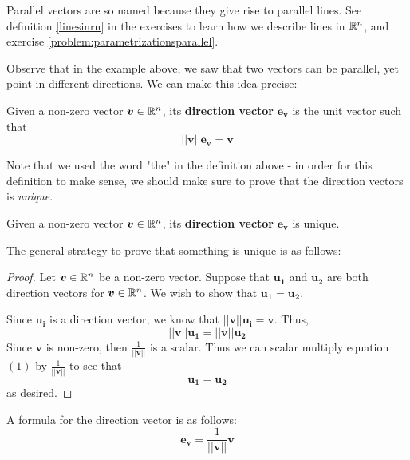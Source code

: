 Parallel vectors are so named because they give rise to parallel lines.  See definition \ref{linesinrn} in the exercises to learn how we describe lines in $\mathbb{R}^n$, and exercise \ref{problem:parametrizationsparallel}.

Observe that in the example above, we saw that two vectors can be parallel, yet point in different directions.  We can make this idea precise:

    \begin{definition}
    Given a non-zero vector $\bm{v} \in \mathbb{R}^n$, its \textbf{direction vector} $\bm{e_v}$ is the unit vector such that 
    $$||\bm{v}||\bm{e_v} = \bm{v}$$
    \end{definition}

Note that we used the word "the" in the definition above - in order for this definition to make sense, we should make sure to prove that the direction vectors is \textit{unique}.

\begin{proposition}
    Given a non-zero vector $\bm{v} \in \mathbb{R}^n$, its \textbf{direction vector} $\bm{e_v}$ is unique. 
\end{proposition}

The general strategy to prove that something is unique is as follows:





\begin{proof}
    Let $\bm{v} \in \mathbb{R}^n$ be a non-zero vector.  Suppose that $\bm{u_1}$ and $\bm{u_2}$ are both direction vectors for $\bm{v} \in \mathbb{R}^n$.  We wish to show that $\bm{u_1} = \bm{u_2}$. 

    Since $\bm{u_i}$ is a direction vector, we know that $||\bm{v}||\bm{u_i} = \bm{v}$.  Thus, \begin{equation}
        ||\bm{v}||\bm{u_1} = ||\bm{v}||\bm{u_2}
    \end{equation}
    Since $\bm{v}$ is non-zero, then $\frac{1}{||\bm{v}||}$ is a scalar.  Thus we can scalar multiply equation $(1)$ by $\frac{1}{||\bm{v}||}$ to see that $$\bm{u_1} = \bm{u_2}$$ as desired.

\end{proof}




\begin{proposition}
     A formula for the direction vector is as follows: $$\bm{e_v} = \frac{1}{||\bm{v}||}\bm{v}$$
\end{proposition}














